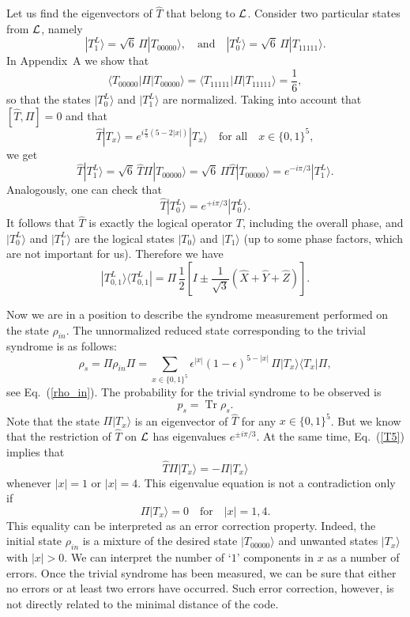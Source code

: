 \documentclass[pra,twocolumn,showpacs]{revtex4}
\newcommand{\calL}{{\cal L }}
\newcommand{\la}{\langle}
\newcommand{\ra}{\rangle}
\DeclareMathOperator*{\tr}{\mathop{\mathrm{Tr}}}
\begin{document}
Let us find the eigenvectors of $\hat{T}$ that belong to $\calL$.
Consider two particular states from $\calL$, namely
\[
|T_1^L\ra =\sqrt{6}\, \Pi |T_{00000}\ra,
 \quad  \text{and} \quad
|T_0^L\ra =\sqrt{6}\, \Pi |T_{11111}\ra.
\]
In Appendix~A we show that 
\begin{equation}\label{frac16}
\la T_{00000}|\Pi|T_{00000}\ra = \la T_{11111}|\Pi|T_{11111}\ra = \frac16,
\end{equation}
so that the states $|T_0^L\ra$ and $|T_1^L\ra$ are normalized.
Taking into account that $[\hat{T},\Pi]=0$ and that
\begin{equation}
\label{T5}
\hat{T} |T_x\ra = e^{i\frac{\pi}3 (5-2|x|)}|T_x\ra \quad \text{for all}
\quad x\in \{0,1\}^5,
\end{equation}
we get
\[
\hat{T} |T_1^L\ra = \sqrt{6} \, \hat{T} \Pi |T_{00000}\ra =
\sqrt{6} \, \Pi \hat{T} |T_{00000}\ra = e^{-i\pi/3} |T_1^L\ra.
\]
Analogously, one can check that 
\[
\hat{T} |T_0^L\ra = e^{+i\pi/3} |T_0^L\ra.
\]
It follows that $\hat{T}$ is exactly the logical operator $T$, including the
overall phase, and $|T_0^L\ra$ and $|T_1^L\ra$ are the logical states
$|T_0\ra$ and $|T_1\ra$ (up to some phase factors, which are not important for
us). Therefore we have
\begin{equation}\label{T01-basis}
|T_{0,1}^L\ra\la T_{0,1}^L| =
\Pi \, \frac12 \left[ 
I \pm \frac1{\sqrt{3}} ( \hat{X} + \hat{Y} + \hat{Z} )\right].
\end{equation}

Now we are in a position to describe the syndrome measurement performed on the
state $\rho_{in}$. The unnormalized reduced state corresponding to the trivial
syndrome is as follows:
\begin{equation}
\label{output}
\rho_s=\Pi \rho_{in} \Pi = 
\sum_{x\in \{0,1\}^5}\! \epsilon^{|x|} (1-\epsilon)^{5-|x|} \,
\Pi |T_x\ra\la T_x| \Pi,
\end{equation}
see Eq.~(\ref{rho_in}). The probability for the trivial syndrome
to be observed is 
\[
p_s=\tr\rho_s.
\]
Note that the state $\Pi|T_x\ra$ is an eigenvector of $\hat{T}$ for any $x\in
\{0,1\}^5$. But we know that the restriction of $\hat{T}$ on $\calL$ has
eigenvalues $e^{\pm i \pi/3}$.  At the same time, Eq.~(\ref{T5}) implies that
\[
\hat{T} \Pi |T_x\ra = - \Pi |T_x\ra
\]
whenever $|x|=1$ or $|x|=4$. 
This eigenvalue equation is not a contradiction only if
\[
\Pi |T_x\ra=0\quad \text{for} \quad |x|=1,4.
\]
This equality can be interpreted as an error correction property. Indeed, the
initial state $\rho_{in}$ is a mixture of the desired state $|T_{00000}\ra$
and unwanted states $|T_x\ra$ with $|x|>0$. We can interpret the number of `$1$'
components in $x$ as a number of errors. Once the trivial syndrome has been
measured, we can be sure that either no errors or at least two errors have
occurred. Such error correction, however, is not directly related to the
minimal distance of the code.
\end{document}
